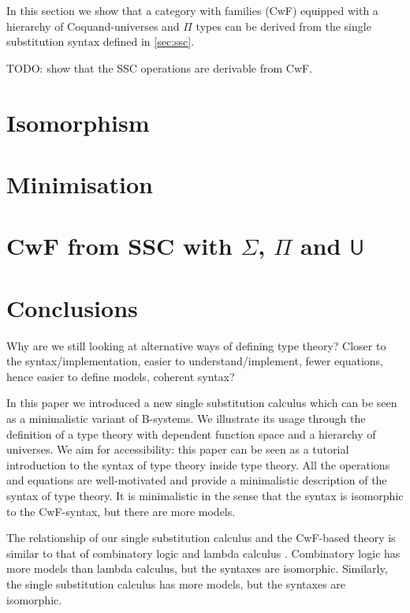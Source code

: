 \documentclass[sigplan,10pt,anonymous,review]{acmart}\settopmatter{printfolios=true,printccs=false,printacmref=false}
\newcommand{\U}{\mathsf{U}}
\begin{document}
In this section we show that a category with families (CwF) equipped
with a hierarchy of Coquand-universes and $\Pi$ types can be derived
from the single substitution syntax defined in \autoref{sec:ssc}.

TODO: show that the SSC operations are derivable from CwF.

\section{Isomorphism}
\label{sec:iso}

\section{Minimisation}

\section{CwF from SSC with $\Sigma$, $\Pi$ and $\U$}

\section{Conclusions}
\label{sec:conclusion}

Why are we still looking at alternative ways of defining type theory?
Closer to the syntax/implementation, easier to understand/implement,
fewer equations, hence easier to define models, coherent syntax?


In this paper we introduced a new single substitution calculus which
can be seen as a minimalistic variant of B-systems. We illustrate its
usage through the definition of a type theory with dependent function
space and a hierarchy of universes. We aim for accessibility: this
paper can be seen as a tutorial introduction to the syntax of type
theory inside type theory. All the operations and equations are
well-motivated and provide a minimalistic description of the syntax of
type theory. It is minimalistic in the sense that the syntax is
isomorphic to the CwF-syntax, but there are more models. 

The relationship of our single substitution calculus and the CwF-based
theory is similar to that of combinatory logic and lambda calculus
\cite{DBLP:conf/fscd/AltenkirchKSV23}. Combinatory logic has more
models than lambda calculus, but the syntaxes are
isomorphic. Similarly, the single substitution calculus has more
models, but the syntaxes are isomorphic.
\end{document}
